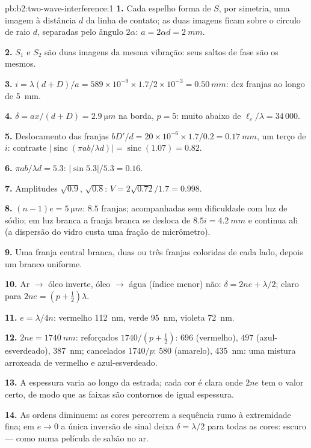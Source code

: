 \begin{solution}{pb:b2:two-wave-interference:1}
\textbf{1.} Cada espelho forma de $S$, por simetria, uma imagem à distância $d$ da
linha de contato; as duas imagens ficam sobre o círculo de raio $d$, separadas
pelo ângulo $2\alpha$: $a = 2\alpha d = \qty{2}{mm}$.

\textbf{2.} $S_1$ e $S_2$ são duas imagens da mesma vibração: seus
saltos de fase são os mesmos.

\textbf{3.} $i = \lambda(d + D)/a = 589 \times 10^{-9} \times 1.7/2 \times 10^{-3} = \qty{0.50}{mm}$: dez
franjas ao longo de \qty{5}{mm}.

\textbf{4.} $\delta = ax/(d + D) = \qty{2.9}{\micro m}$ na borda, $p = 5$: muito abaixo de
$\ell_c/\lambda = 34\,000$.

\textbf{5.} Deslocamento das franjas $bD'/d = 20 \times 10^{-6} \times 1.7/0.2 = \qty{0.17}{mm}$, um terço de
$i$: contraste $|\operatorname{sinc}(\pi ab/\lambda d)| = \operatorname{sinc}(1.07) = 0.82$.

\textbf{6.} $\pi ab/\lambda d = 5.3$: $|\sin5.3|/5.3 = 0.16$.

\textbf{7.} Amplitudes $\sqrt{0.9}$, $\sqrt{0.8}$: $V = 2\sqrt{0.72}/1.7 = 0.998$.

\textbf{8.} $(n - 1)e = \qty{5}{\micro m}$: $8.5$ franjas; acompanhadas sem dificuldade com
luz de sódio; em luz branca a franja branca se desloca de $8.5i = \qty{4.2}{mm}$
e continua ali (a dispersão do vidro custa uma fração de
micrômetro).

\textbf{9.} Uma franja central branca, duas ou três franjas coloridas de
cada lado, depois um branco uniforme.

\textbf{10.} Ar $\to$ óleo inverte, óleo $\to$ água (índice menor) não:
$\delta = 2ne + \lambda/2$; claro para $2ne = (p + \tfrac12)\lambda$.

\textbf{11.} $e = \lambda/4n$: vermelho \qty{112}{nm}, verde \qty{95}{nm}, violeta \qty{72}{nm}.

\textbf{12.} $2ne = \qty{1740}{nm}$: reforçados $1740/(p + \tfrac12)$: $696$ (vermelho), $497$
(azul-esverdeado), \qty{387}{nm}; cancelados $1740/p$: $580$ (amarelo), \qty{435}{nm}:
uma mistura arroxeada de vermelho e azul-esverdeado.

\textbf{13.} A espessura varia ao longo da estrada; cada cor é clara
onde $2ne$ tem o valor certo, de modo que as faixas são contornos de igual
espessura.

\textbf{14.} As ordens diminuem: as cores percorrem a sequência
rumo à extremidade fina; em $e \to 0$ a única inversão de sinal deixa
$\delta = \lambda/2$ para todas as cores: escuro --- como numa película de sabão no ar.


\end{solution}
